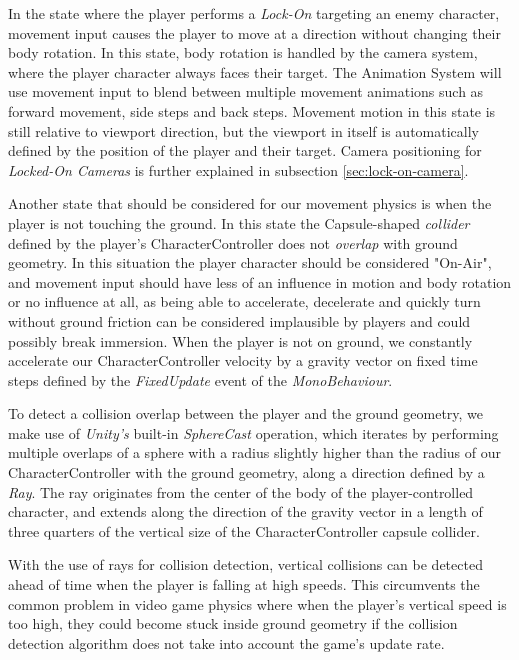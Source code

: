 In the state where the player performs a \emph{Lock-On} targeting an enemy character, movement input causes the player to move at a direction without changing their body rotation. In this state, body rotation is handled by the camera system, where the player character always faces their target. The Animation System will use movement input to blend between multiple movement animations such as forward movement, side steps and back steps. Movement motion in this state is still relative to viewport direction, but the viewport in itself is automatically defined by the position of the player and their target. Camera positioning for \emph{Locked-On Cameras} is further explained in subsection \ref{sec:lock-on-camera}.

Another state that should be considered for our movement physics is when the player is not touching the ground. In this state the Capsule-shaped \emph{collider} defined by the player's CharacterController does not \emph{overlap} with ground geometry. In this situation the player character should be considered "On-Air", and movement input should have less of an influence in motion and body rotation or no influence at all, as being able to accelerate, decelerate and quickly turn without ground friction can be considered implausible by players and could possibly break immersion. When the player is not on ground, we constantly accelerate our CharacterController velocity by a gravity vector on fixed time steps defined by the \emph{FixedUpdate} event of the \emph{MonoBehaviour}.


To detect a collision overlap between the player and the ground geometry, we make use of \emph{Unity's} built-in \emph{SphereCast} operation, which iterates by performing multiple overlaps of a sphere with a radius slightly higher than the radius of our CharacterController with the ground geometry, along a direction defined by a \emph{Ray}. The ray originates from the center of the body of the player-controlled character, and extends along the direction of the gravity vector in a length of three quarters of the vertical size of the CharacterController capsule collider. 

With the use of rays for collision detection, vertical collisions can be detected ahead of time when the player is falling at high speeds. This circumvents the common problem in video game physics where when the player's vertical speed is too high, they could become stuck inside ground geometry if the collision detection algorithm does not take into account the game's update rate. %

